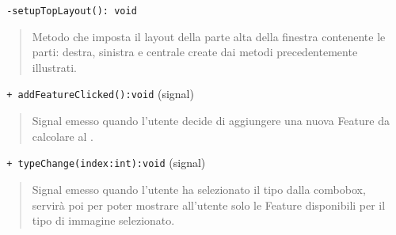 \color{blue}\verb! -setupTopLayout(): void!
\begin{quote}
\color{black} Metodo che imposta il layout della parte alta della finestra contenente le parti: destra, sinistra e centrale create dai metodi precedentemente illustrati.
\end{quote}
\color{blue}\verb! + addFeatureClicked():void! (signal)
\color{black} 
\begin{quote}
Signal\g{} emesso quando l'utente decide di aggiungere una nuova Feature\g{} da calcolare al \protocol{}.
\end{quote}
\color{blue}\verb! + typeChange(index:int):void! (signal)
\color{black} 
\begin{quote}
Signal\g{} emesso quando l'utente ha selezionato il tipo dalla combobox, servirà poi per poter mostrare all'utente solo le Feature\g{} disponibili per il tipo di immagine selezionato.
\end{quote}
\color{black}
\pagebreak
